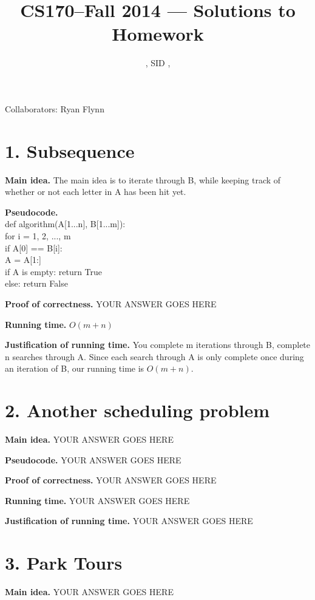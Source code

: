 \documentclass[11pt]{article}
\title{CS170--Fall 2014 --- Solutions to Homework \Homework}
\author{\Name, SID \SID, \texttt{\Login}}
\begin{document}
\maketitle

\noindent
Collaborators: Ryan Flynn


\section*{1. Subsequence}
\noindent
\textbf{Main idea.}
The main idea is to iterate through B, while keeping track of whether or not each letter in A has been hit yet.  


\noindent
\textbf{Pseudocode.}\\
def algorithm(A[1...n], B[1...m]): \\
\indent for i = 1, 2, ..., m \\
\indent\indent if A[0] == B[i]: \\
\indent\indent\indent A = A[1:] \\
\indent if A is empty: return True \\
\indent else: return False

\noindent
\textbf{Proof of correctness.}
YOUR ANSWER GOES HERE

\noindent
\textbf{Running time.}
$O(m + n)$


\noindent
\textbf{Justification of running time.}
You complete m iterations through B, complete n searches through A.  Since each search through A is only complete once during an iteration of B, our running time is $O(m + n)$. 

\newpage
\section*{2. Another scheduling problem}
\noindent
\textbf{Main idea.}
YOUR ANSWER GOES HERE


\noindent
\textbf{Pseudocode.}
YOUR ANSWER GOES HERE

\noindent
\textbf{Proof of correctness.}
YOUR ANSWER GOES HERE


\noindent
\textbf{Running time.}
YOUR ANSWER GOES HERE


\noindent
\textbf{Justification of running time.}
YOUR ANSWER GOES HERE



\newpage
\section*{3. Park Tours}
\noindent
\textbf{Main idea.}
YOUR ANSWER GOES HERE
\end{document}
